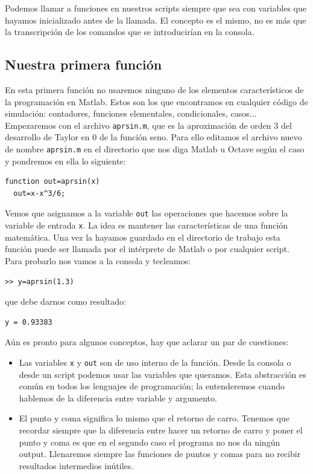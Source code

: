 Podemos llamar a funciones en nuestros scripts siempre que sea con
variables que hayamos inicializado antes de la llamada. El concepto es
el mismo, no es más que la transcripción de los comandos que se
introducirían en la consola.


\subsection{Nuestra primera función}

En esta primera función no usaremos ninguno de los elementos
característicos de la programación en Matlab. Estos son los que
encontramos en cualquier código de simulación: contadores, funciones
elementales, condicionales, casos... Empezaremos con el archivo
\texttt{aprsin.m}, que es la aproximación de orden 3 del desarrollo de
Taylor en 0 de la función seno. Para ello editamos el archivo nuevo de
nombre \texttt{aprsin.m} en el directorio que nos diga Matlab u Octave
según el caso y pondremos en ella lo siguiente:

\begin{lstlisting}
function out=aprsin(x)
  out=x-x^3/6;
\end{lstlisting}

Vemos que asignamos a la variable \texttt{out} las operaciones
que hacemos sobre la variable de entrada \texttt{x}. La idea es
mantener las características de una función matemática. Una vez la
hayamos guardado en el directorio de trabajo esta función puede ser llamada
por el intérprete de Matlab o por cualquier script.
Para probarlo nos vamos a la consola y tecleamos:

\begin{lstlisting}
>> y=aprsin(1.3)
\end{lstlisting}
que debe darnos como resultado:

\begin{lstlisting}
y = 0.93383
\end{lstlisting}
Aún es pronto para algunos conceptos, hay que aclarar un par de
cuestiones:

\begin{itemize}
\item Las variables \texttt{x} y \texttt{out} son de uso interno de la
  función.  Desde la consola o desde un script podemos usar las
  variables que queramos. Esta abstracción es común en todos los
  lenguajes de programación; la entenderemos cuando hablemos de la
  diferencia entre variable y argumento.
\item El punto y coma significa lo mismo que el retorno de carro.
  Tenemos que recordar siempre que la diferencia entre hacer un
  retorno de carro y poner el punto y coma es que en el segundo caso
  el programa no nos da ningún output. Llenaremos siempre las
  funciones de puntos y comas para no recibir resultados intermedios
  inútiles.
\end{itemize}

